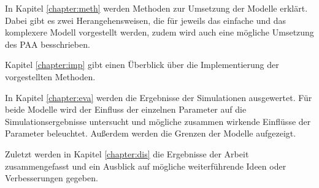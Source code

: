 In Kapitel \ref{chapter:meth} werden Methoden zur Umsetzung der Modelle erklärt. Dabei gibt es zwei Herangehensweisen, die für jeweils das einfache und das komplexere Modell vorgestellt werden, zudem wird auch eine mögliche Umsetzung des PAA besschrieben.

Kapitel \ref{chapter:imp} gibt einen Überblick über die Implementierung der vorgestellten Methoden. 

In Kapitel \ref{chapter:eva} werden die Ergebnisse der Simulationen ausgewertet. Für beide Modelle wird der Einfluss der einzelnen Parameter auf die Simulationsergebnisse untersucht und mögliche zusammen wirkende Einflüsse der Parameter beleuchtet. Außerdem werden die Grenzen der Modelle aufgezeigt.

Zuletzt werden in Kapitel \ref{chapter:dis} die Ergebnisse der Arbeit zusammengefasst und ein Ausblick auf mögliche weiterführende Ideen oder Verbesserungen gegeben.